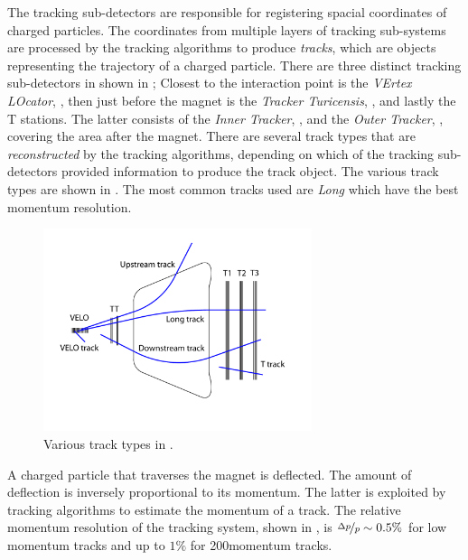 The tracking sub-detectors are responsible for registering spacial coordinates of charged particles.
The coordinates from multiple layers of tracking sub-systems are processed by the tracking algorithms
to produce {\it tracks}, which are objects representing the trajectory of a charged particle. There are
three distinct tracking sub-detectors in \lhcb shown in ; Closest to the interaction point is
the {\it VErtex LOcator}, \velo, then just before the \lhcb magnet is the {\it Tracker Turicensis}, \ttracker,
and  lastly the T stations. The latter consists of the {\it Inner Tracker}, \intr, and the {\it Outer Tracker}, \ot,
covering the area after the \lhcb magnet. There are several track types that are {\it reconstructed} by
the tracking algorithms, depending on which of the tracking sub-detectors provided information to produce
the track object. The various track types are shown in . The most common tracks used
are {\it Long} which have the best momentum resolution.

\begin{figure}[t]
  \centering
  \includegraphics[width=0.7\textwidth]{Figures/Chapter2/trackTypesRunIAndII}
  \caption{Various track types in \lhcb.}
  \label{track_types}
\end{figure}

A charged particle that traverses the \lhcb magnet is deflected. The amount of deflection is inversely proportional
to its momentum. The latter is exploited by tracking algorithms to estimate the momentum of a track. The relative
momentum resolution of the tracking system, shown in , is $\nicefrac{\Delta p}{p} \sim 0.5 \%$
for low momentum tracks and up to $1\%$ for 200\gevc momentum tracks.

